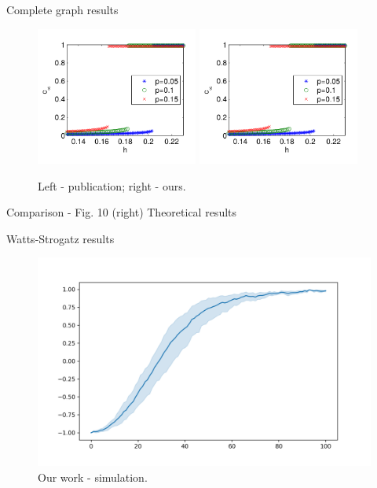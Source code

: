 \documentclass[10pt]{beamer}
\begin{document}
\begin{frame}{Complete graph results}
	\begin{figure}
		\includegraphics[width=0.475\textwidth]{../resources/images/fig10-right.png}
		\hfill
		\includegraphics[width=0.475\textwidth]{../resources/images/fig10-right.png}
		\caption{Left - publication; right - ours.}
	\end{figure}
	Comparison - Fig. 10 (right)
	Theoretical results
\end{frame}

\begin{frame}{Watts-Strogatz results}
	\begin{figure}
		\includegraphics[width=\textwidth]{../results/images/example.png}
		\caption{Our work - simulation.}
	\end{figure}
\end{frame}
\end{document}

